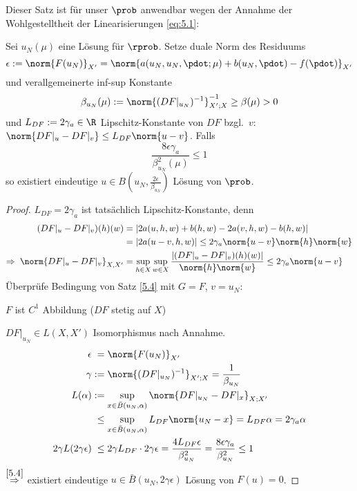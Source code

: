 Dieser Satz ist für unser $\prob$ anwendbar wegen der Annahme der Wohlgestelltheit der Linearisierungen \eqref{eq:5.1}:

\begin{kor} \label{5.5}
	Sei $u_N(\mu)$ eine Lösung für $\rprob$.
	Setze duale Norm des Residuums
	\begin{equation}
		\epsilon := \norm{F(u_N)}_{X'} = \norm{a(u_N,u_N,\pdot;\mu)+b(u_N,\pdot)-f(\pdot)}_{X'}
		\label{eq:5.3}
	\end{equation}
	und verallgemeinerte inf-sup Konstante
	\[
		\beta_{u_N}(\mu) := \norm{(DF|_{u_N})^{-1}}_{X';X}^{-1} \geq \beta(\mu) > 0
	\]
	und $L_{DF} := 2\gamma_a \in \R$ Lipschitz-Konstante von $DF$ bzgl.\ $v$: $\norm{DF|_u-DF|_v} \leq L_{DF} \norm{u-v}$.
	Falls
	\[
		\frac{8\epsilon\gamma_a}{\beta_{u_N}^2(\mu)} \leq 1
	\]
	so existiert eindeutige $u \in B(u_N,\frac{2\epsilon}{\beta_{u_N}})$ Lösung von $\prob$.

	\begin{proof}
		$L_{DF} = 2\gamma_a$ ist tatsächlich Lipschitz-Konstante, denn
		\begin{align*}
			(DF|_u-DF|_v)(h)(w) &= |2a(u,h,w)+b(h,w)-2a(v,h,w)-b(h,w)|\\
			&= |2a(u-v,h,w)| \leq 2\gamma_a \norm{u-v}\norm{h}\norm{w}\\
			\Rightarrow \; \norm{DF|_u-DF|_v}_{X,X'} &= \sup_{h\in X} \sup_{w\in X} \frac{|(DF|_u-DF|_v)(h)(w)|}{\norm{h}\norm{w}} \leq 2\gamma_a \norm{u-v}
		\end{align*}
		Überprüfe Bedingung von Satz \ref{5.4} mit $G=F$, $v=u_N$:

		$F$ ist $C^1$ Abbildung ($DF$ stetig auf $X$)

		$DF|_{u_N} \in L(X,X')$ Isomorphismus nach Annahme.
		\begin{align*}
			\epsilon &\;= \norm{F(u_N)}_{X'}\\
			\gamma &:= \norm{(DF|_{u_N})^{-1}}_{X';X} = \frac{1}{\beta_{u_N}}\\
			L(\alpha) &:= \sup_{x\in\bar B(u_N,\alpha)} \norm{DF|_{u_N}-DF|_x}_{X;X'}\\
			&\;\leq \sup_{x\in\bar B(u_N,\alpha)} L_{DF} \norm{u_N-x} = L_{DF} \alpha = 2\gamma_a \alpha\\
			2\gamma L(2\gamma\epsilon) &\;\leq 2\gamma L_{DF} \cdot 2\gamma\epsilon = \frac{4L_{DF}\epsilon}{\beta_{u_N}^2} = \frac{8\epsilon\gamma_a}{\beta_{u_N}^2} \leq 1
		\end{align*}
		$\stackrel{\ref{5.4}}{\Rightarrow}$ existiert eindeutige $u \in \bar B(u_N,2\gamma\epsilon)$ Lösung von $F(u)=0$.
	\end{proof}
\end{kor}

